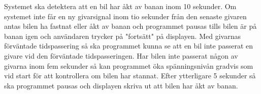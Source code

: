 Systemet ska detektera att en bil har åkt av banan inom 10 sekunder. Om systemet
inte får en ny givarsignal inom tio sekunder från den senaste givaren antas bilen ha
fastnat eller åkt av banan och programmet pausas tills bilen är på banan igen
och användaren trycker på "fortsätt" på displayen. Med givarnas förväntade tidspassering så ska programmet kunna se att en bil inte passerat en givare vid den förväntade tidspasseringen. Har bilen inte passerat någon av givarna inom fem sekunder så kan programmet öka spänningsnivån gradvis som vid start för att kontrollera om bilen har stannat. Efter ytterligare 5 sekunder så ska programmet pausas och displayen skriva ut att bilen har åkt av banan.


